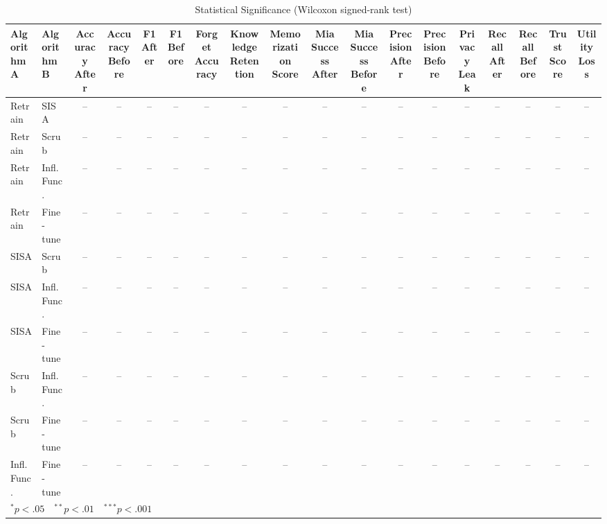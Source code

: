 \begin{table}[t]
\centering
\caption{Statistical Significance (Wilcoxon signed-rank test)}
\label{tab:significance}
\small
\begin{tabular}{llcccccccccccccccc}
\toprule
Algorithm A & Algorithm B & Accuracy After & Accuracy Before & F1 After & F1 Before & Forget Accuracy & Knowledge Retention & Memorization Score & Mia Success After & Mia Success Before & Precision After & Precision Before & Privacy Leak & Recall After & Recall Before & Trust Score & Utility Loss \\
\midrule
Retrain & SISA & -- & -- & -- & -- & -- & -- & -- & -- & -- & -- & -- & -- & -- & -- & -- & -- \\
Retrain & Scrub & -- & -- & -- & -- & -- & -- & -- & -- & -- & -- & -- & -- & -- & -- & -- & -- \\
Retrain & Infl. Func. & -- & -- & -- & -- & -- & -- & -- & -- & -- & -- & -- & -- & -- & -- & -- & -- \\
Retrain & Fine-tune & -- & -- & -- & -- & -- & -- & -- & -- & -- & -- & -- & -- & -- & -- & -- & -- \\
SISA & Scrub & -- & -- & -- & -- & -- & -- & -- & -- & -- & -- & -- & -- & -- & -- & -- & -- \\
SISA & Infl. Func. & -- & -- & -- & -- & -- & -- & -- & -- & -- & -- & -- & -- & -- & -- & -- & -- \\
SISA & Fine-tune & -- & -- & -- & -- & -- & -- & -- & -- & -- & -- & -- & -- & -- & -- & -- & -- \\
Scrub & Infl. Func. & -- & -- & -- & -- & -- & -- & -- & -- & -- & -- & -- & -- & -- & -- & -- & -- \\
Scrub & Fine-tune & -- & -- & -- & -- & -- & -- & -- & -- & -- & -- & -- & -- & -- & -- & -- & -- \\
Infl. Func. & Fine-tune & -- & -- & -- & -- & -- & -- & -- & -- & -- & -- & -- & -- & -- & -- & -- & -- \\
\midrule
\multicolumn{18}{l}{\footnotesize $^{*} p<.05\quad ^{**} p<.01\quad ^{***} p<.001$}
\bottomrule
\end{tabular}
\end{table}
